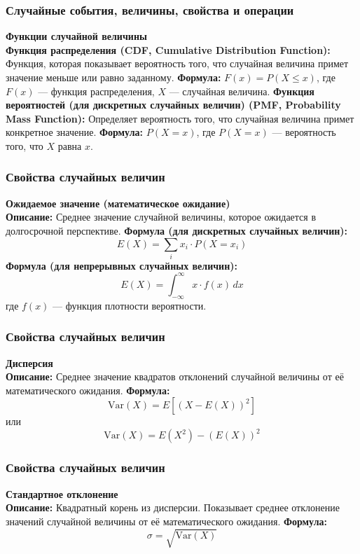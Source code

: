 \documentclass[aspectratio=169]{beamer}
\begin{document}
\begin{frame}
\frametitle{Случайные события, величины, свойства и операции}
\textbf{Функции случайной величины}
\newline\\
\textbf{Функция распределения (CDF, Cumulative Distribution Function):} Функция, которая показывает вероятность того, что случайная величина примет значение меньше или равно заданному.
\newline
\textbf{Формула:} \( F(x) = P(X \leq x) \), где \( F(x) \) — функция распределения, \( X \) — случайная величина.
\newline
\textbf{Функция вероятностей (для дискретных случайных величин) (PMF, Probability Mass Function):} Определяет вероятность того, что случайная величина примет конкретное значение.
\newline
\textbf{Формула:} \( P(X = x) \), где \( P(X = x) \) — вероятность того, что \( X \) равна \( x \).
\end{frame}

\begin{frame}
\frametitle{Свойства случайных величин}
\textbf{Ожидаемое значение (математическое ожидание)}
\newline\\
\textbf{Описание:} Среднее значение случайной величины, которое ожидается в долгосрочной перспективе.
\newline
\textbf{Формула (для дискретных случайных величин):}
  \[
  E(X) = \sum_{i} x_i \cdot P(X = x_i)
  \]
\newline
\textbf{Формула (для непрерывных случайных величин):}
  \[
  E(X) = \int_{-\infty}^{\infty} x \cdot f(x) \, dx
  \]
где \( f(x) \) — функция плотности вероятности.
\end{frame}

\begin{frame}
\frametitle{Свойства случайных величин}
\textbf{Дисперсия}
\newline\\
\textbf{Описание:} Среднее значение квадратов отклонений случайной величины от её математического ожидания.
\newline
\textbf{Формула:}
  \[
  \text{Var}(X) = E[(X - E(X))^2]
  \]
или
  \[
  \text{Var}(X) = E(X^2) - (E(X))^2
  \]
\end{frame}

\begin{frame}
\frametitle{Свойства случайных величин}
\textbf{Стандартное отклонение}
\newline\\
\textbf{Описание:} Квадратный корень из дисперсии. Показывает среднее отклонение значений случайной величины от её математического ожидания.
\newline
\textbf{Формула:}
  \[
  \sigma = \sqrt{\text{Var}(X)}
  \]
\end{frame}
\end{document}
